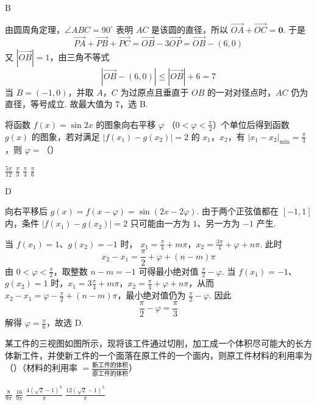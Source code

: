 \begin{answer}
B
\end{answer}

\begin{solution}
由圆周角定理，\(\angle ABC=90^\circ\) 表明 \(AC\) 是该圆的直径，所以 \(\overrightarrow{OA}+\overrightarrow{OC}=\boldsymbol{0}\). 于是
\[
\overrightarrow{PA}+\overrightarrow{PB}+\overrightarrow{PC}
=\overrightarrow{OB}-3\overrightarrow{OP}
=\overrightarrow{OB}-(6,0)
\]
又 \(|\overrightarrow{OB}|=1\)，由三角不等式
\[
\left|\overrightarrow{OB}-(6,0)\right|\leqslant|\overrightarrow{OB}|+6=7
\]
当 \(B=(-1,0)\)，并取 \(A\)，\(C\) 为过原点且垂直于 \(OB\) 的一对对径点时，\(AC\) 仍为直径，等号成立. 故最大值为 \(7\)，选 B.
\end{solution}

\begin{problem}
将函数 \( f(x) = \sin 2x \) 的图象向右平移 \( \varphi \) （\(0 < \varphi < \frac{\pi}{2}\)）个单位后得到函数 \( g(x) \) 的图象，若对满足 \( |f(x_1) - g(x_2)| = 2 \) 的 \(x_1\)，\(x_2\)，有 \( |x_1 - x_2|_{\min} = \frac{\pi}{3} \)，则 \( \varphi = \)（\quad）

\choices
    {\(\frac{5\pi}{12}\)}
    {\(\frac{\pi}{3}\)}
    {\( \frac{\pi}{4} \)}
    {\(\frac{\pi}{6}\)}
\end{problem}

\begin{answer}
D
\end{answer}

\begin{solution}
向右平移后 \(g(x)=f(x-\varphi)=\sin(2x-2\varphi)\). 由于两个正弦值都在 \([-1,1]\) 内，条件 \(|f(x_1)-g(x_2)|=2\) 只可能由一方为 \(1\)、另一方为 \(-1\) 产生.

当 \(f(x_1)=1\)、\(g(x_2)=-1\) 时，
\(x_1=\frac\pi4+m\pi\)，\(x_2=\frac{3\pi}{4}+\varphi+n\pi\).
此时
\[
x_2-x_1=\frac\pi2+\varphi+(n-m)\pi
\]
由 \(0<\varphi<\frac{\pi}{2}\)，取整数 \(n-m=-1\) 可得最小绝对值 \(\frac{\pi}{2}-\varphi\). 当 \(f(x_1)=-1\)、\(g(x_2)=1\) 时，\(x_1=3\frac{\pi}{4}+m\pi\)，\(x_2=\frac{\pi}{4}+\varphi+n\pi\)，从而 \(x_2-x_1=\varphi-\frac{\pi}{2}+(n-m)\pi\)，最小绝对值仍为 \(\frac{\pi}{2}-\varphi\). 因此
\[
\frac\pi2-\varphi=\frac\pi3
\]
解得 \(\varphi=\frac{\pi}{6}\)，故选 D.
\end{solution}

\begin{problem}
某工件的三视图如图所示，现将该工件通过切削，加工成一个体积尽可能大的长方体新工件，并使新工件的一个面落在原工件的一个面内，则原工件材料的利用率为（\quad）（材料的利用率 \(=\frac{\text{新工件的体积}}{\text{原工件的体积}}\)）


\choices
    {\(\frac{8}{9\pi}\)}
    {\(\frac{16}{9\pi}\)}
    {\(\frac{4(\sqrt{2} - 1)^3}{\pi}\)}
    {\(\frac{12(\sqrt{2} - 1)^3}{\pi}\)}
\end{problem}

